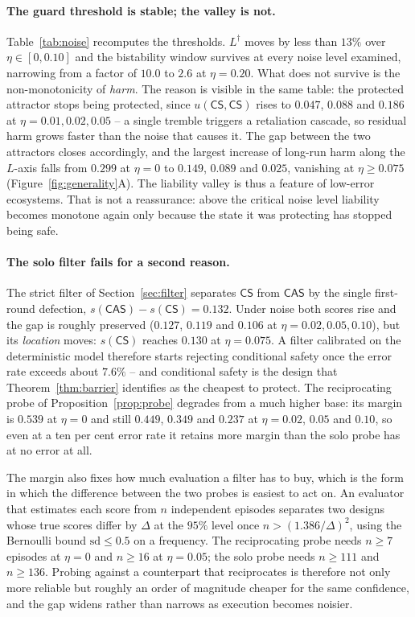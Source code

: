 \documentclass[11pt,a4paper]{article}
\theoremstyle{definition}
\newcommand{\CS}{\textsf{CS}}
\newcommand{\CAS}{\textsf{CAS}}
\begin{document}
\paragraph{The guard threshold is stable; the valley is not.}
Table~\ref{tab:noise} recomputes the thresholds. $L^{\dagger}$ moves by less
than $13\%$ over $\eta\in[0,0.10]$ and the bistability window survives at every
noise level examined, narrowing from a factor of $10.0$ to $2.6$ at
$\eta=0.20$. What does not survive is the non-monotonicity of \emph{harm}.
The reason is visible in the same table: the protected attractor stops being
protected, since $u(\CS,\CS)$ rises to $0.047$, $0.088$ and $0.186$ at
$\eta=0.01,0.02,0.05$ -- a single tremble triggers a retaliation cascade, so
residual harm grows faster than the noise that causes it. The gap between the
two attractors closes accordingly, and the largest increase of long-run harm
along the $L$-axis falls from $0.299$ at $\eta=0$ to $0.149$, $0.089$ and
$0.025$, vanishing at $\eta\ge0.075$ (Figure~\ref{fig:generality}A). The
liability valley is thus a feature of low-error ecosystems. That is not a
reassurance: above the critical noise level liability becomes monotone again
only because the state it was protecting has stopped being safe.



\paragraph{The solo filter fails for a second reason.}
The strict filter of Section~\ref{sec:filter} separates $\CS$ from $\CAS$ by
the single first-round defection, $s(\CAS)-s(\CS)=0.132$. Under noise both
scores rise and the gap is roughly preserved ($0.127$, $0.119$ and $0.106$ at
$\eta=0.02,0.05,0.10$), but its \emph{location} moves: $s(\CS)$ reaches
$0.130$ at $\eta=0.075$. A filter calibrated on the deterministic model
therefore starts rejecting conditional safety once the error rate exceeds
about $7.6\%$ -- and conditional safety is the design that
Theorem~\ref{thm:barrier} identifies as the cheapest to protect. The
reciprocating probe of
Proposition~\ref{prop:probe} degrades from a much higher base: its margin is
$0.539$ at $\eta=0$ and still $0.449$, $0.349$ and $0.237$ at $\eta=0.02$,
$0.05$ and $0.10$, so even at a ten per cent error rate it retains more margin
than the solo probe has at no error at all.

The margin also fixes how much evaluation a filter has to buy, which is the
form in which the difference between the two probes is easiest to act on. An
evaluator that estimates each score from $n$ independent episodes separates
two designs whose true scores differ by $\Delta$ at the $95\%$ level once
$n>(1.386/\Delta)^{2}$, using the Bernoulli bound $\mathrm{sd}\le0.5$ on a
frequency. The reciprocating probe needs $n\ge7$ episodes at $\eta=0$ and
$n\ge16$ at $\eta=0.05$; the solo probe needs $n\ge111$ and $n\ge136$. Probing
against a counterpart that reciprocates is therefore not only more reliable
but roughly an order of magnitude cheaper for the same confidence, and the
gap widens rather than narrows as execution becomes noisier.
\end{document}
